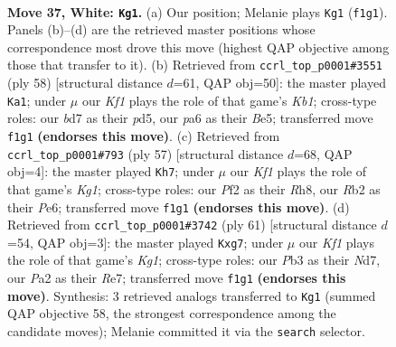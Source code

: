 \documentclass[11pt]{article}
\begin{document}
\clearpage

\begin{figure}[p]\centering
\begin{subfigure}{0.46\textwidth}\centering
\resizebox{\linewidth}{!}{%
\newchessgame
\chessboard[
  setfen={r2r3k/bp1b1Q2/p3p2p/8/8/BP1p3q/PR3P1P/4RK2 w - - 2 37},
  showmover=false,
  pgfstyle=straightmove, color=movearrow, markmove={f1-g1}
]}
\caption{}
\end{subfigure}\hfill
\begin{subfigure}{0.46\textwidth}\centering
\resizebox{\linewidth}{!}{%
\newchessgame
\chessboard[
  setfen={r4r1k/1p4pp/p3Rb2/3pBP2/1q6/3Q4/P1P3PP/1K1R4 w - - 7 30},
  showmover=false,
  pgfstyle=straightmove, color=movearrow, markmove={b1-a1}
]}
\caption{}
\end{subfigure}
\\[4pt]
\begin{subfigure}{0.46\textwidth}\centering
\resizebox{\linewidth}{!}{%
\newchessgame
\chessboard[
  setfen={3r2kr/5p2/p3p2p/3bP1p1/1R6/Q3B3/1Pq2PPP/4R1K1 b - - 6 29},
  showmover=false,
  pgfstyle=straightmove, color=movearrow, markmove={g8-h7}
]}
\caption{}
\end{subfigure}\hfill
\begin{subfigure}{0.46\textwidth}\centering
\resizebox{\linewidth}{!}{%
\newchessgame
\chessboard[
  setfen={2r3k1/3nrpBp/q2p2p1/3P4/PR6/7P/1P3QP1/1B3R1K b - - 0 31},
  showmover=false,
  pgfstyle=straightmove, color=movearrow, markmove={g8-g7}
]}
\caption{}
\end{subfigure}
\caption{\textbf{Move 37, White: \texttt{Kg1}.} (a) Our position; Melanie plays \texttt{Kg1} (\texttt{f1g1}). Panels (b)--(d) are the retrieved master positions whose correspondence most drove this move (highest QAP objective among those that transfer to it). (b) Retrieved from \texttt{ccrl\_top\_p0001\#3551} (ply 58) [structural distance $d$=61, QAP obj=50]: the master played \texttt{Ka1}; under $\mu$ our \emph{Kf1} plays the role of that game's \emph{Kb1}; cross-type roles: our \emph{b}d7 as their \emph{p}d5, our \emph{p}a6 as their \emph{B}e5; transferred move \texttt{f1g1} \textbf{(endorses this move)}. (c) Retrieved from \texttt{ccrl\_top\_p0001\#793} (ply 57) [structural distance $d$=68, QAP obj=4]: the master played \texttt{Kh7}; under $\mu$ our \emph{Kf1} plays the role of that game's \emph{Kg1}; cross-type roles: our \emph{P}f2 as their \emph{R}h8, our \emph{R}b2 as their \emph{P}e6; transferred move \texttt{f1g1} \textbf{(endorses this move)}. (d) Retrieved from \texttt{ccrl\_top\_p0001\#3742} (ply 61) [structural distance $d$=54, QAP obj=3]: the master played \texttt{Kxg7}; under $\mu$ our \emph{Kf1} plays the role of that game's \emph{Kg1}; cross-type roles: our \emph{P}b3 as their \emph{N}d7, our \emph{P}a2 as their \emph{R}e7; transferred move \texttt{f1g1} \textbf{(endorses this move)}. Synthesis: 3 retrieved analogs transferred to \texttt{Kg1} (summed QAP objective 58, the strongest correspondence among the candidate moves); Melanie committed it via the \texttt{search} selector.}
\label{fig:thought-m72}
\end{figure}
\end{document}
